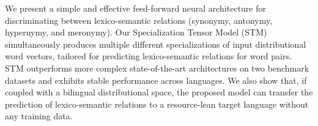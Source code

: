 We present a simple and effective feed-forward neural architecture for discriminating between lexico-semantic relations (synonymy, antonymy, hypernymy, and meronymy). Our Specialization Tensor Model (STM) simultaneously produces multiple different specializations of input distributional word vectors, tailored for predicting lexico-semantic relations for word pairs. STM outperforms more complex state-of-the-art architectures on two benchmark datasets and exhibits stable performance across languages. We also show that, if coupled with a bilingual distributional space, the proposed model can transfer the prediction of lexico-semantic relations to a resource-lean target language without any training data.
